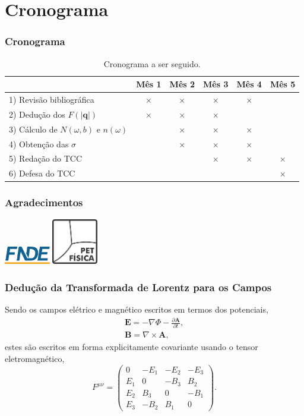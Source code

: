 \documentclass[xcolor=dvipsnames]{beamer}
\renewcommand{\vec}{\mathbf}
\begin{document}
\section{Cronograma}
\begin{frame}
	\frametitle{Cronograma}
	\begin{table}
		\begin{tabular}{lccccc}
			\hline
			& Mês 1 & Mês 2 & Mês 3 & Mês 4 & Mês 5\\
			\hline \hline
			1) Revisão bibliográfica & $\times$ & $\times$ & $\times$ &
			$\times$ & \\
			2) Dedução dos $F(|\vec{q}|)$ & $\times$
				 & $\times$ & $\times$ & & \\
			3) Cálculo de $N(\omega, b)$ e $n(\omega)$ & & $\times$ & $\times$
			& $\times$ & \\
			4) Obtenção das $\sigma$ & & $\times$ &
			$\times$ & $\times$ & \\
			5) Redação do TCC & & & $\times$ & $\times$ & $\times$ \\
			6) Defesa do TCC & & & & & $\times$ \\
			\hline
		\end{tabular}
		\caption{Cronograma a ser seguido.}
	\end{table}
\end{frame}

\begin{frame}
	\frametitle{Agradecimentos}
	\begin{center}
	\includegraphics[width=2cm]{./logos/logoFNDE.png}
	\hspace{2cm}
	\includegraphics[width=2cm]{./logos/logoPET.png}
	\end{center}
\end{frame}

\appendix
\begin{frame}
	\frametitle{Dedução da Transformada de Lorentz para os Campos}
	Sendo os campos elétrico e magnético escritos em termos dos potenciais,
	\begin{gather}
		\vec{E} = - \nabla \Phi - \frac{\partial \vec{A}}{\partial t}, \\
		\vec{B} = \nabla \times \vec{A},
	\end{gather}
	estes são escritos em forma explicitamente covariante usando o tensor
	eletromagnético,
	\begin{equation}
		F^{\mu \nu} = \begin{pmatrix}
			0 & -E_1 & -E_2 & -E_3 \\
			E_1 & 0 & -B_3 & B_2 \\
			E_2 & B_3 & 0 & -B_1 \\
			E_3 & -B_2 & B_1 & 0
		\end{pmatrix}.
	\end{equation}
\end{frame}
\end{document}
